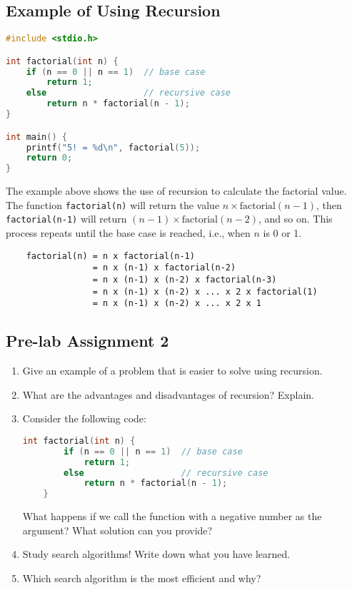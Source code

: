 \subsection{Example of Using Recursion}

\begin{lstlisting}[language=c]
#include <stdio.h>

int factorial(int n) {
	if (n == 0 || n == 1)  // base case
		return 1;
	else                   // recursive case
		return n * factorial(n - 1);
}

int main() {
	printf("5! = %d\n", factorial(5));
	return 0;
}
\end{lstlisting}

The example above shows the use of recursion to calculate the factorial value.  
The function \texttt{factorial(n)} will return the value $n \times \text{factorial}(n-1)$, then \texttt{factorial(n-1)} will return $(n-1) \times \text{factorial}(n-2)$, and so on.  
This process repeats until the base case is reached, i.e., when $n$ is 0 or 1.

\begin{verbatim}
    factorial(n) = n x factorial(n-1)
                 = n x (n-1) x factorial(n-2)
                 = n x (n-1) x (n-2) x factorial(n-3)
                 = n x (n-1) x (n-2) x ... x 2 x factorial(1)
                 = n x (n-1) x (n-2) x ... x 2 x 1
\end{verbatim}

\subsection*{Pre-lab Assignment 2}
\begin{enumerate}
    \item Give an example of a problem that is easier to solve using recursion.
    \item What are the advantages and disadvantages of recursion? Explain.
    \item Consider the following code:
    \begin{lstlisting}[language=c]
	int factorial(int n) {
		if (n == 0 || n == 1)  // base case
			return 1;
		else                   // recursive case
			return n * factorial(n - 1);
	}
\end{lstlisting}
    What happens if we call the function with a negative number as the argument?  
    What solution can you provide?
    \item Study search algorithms! Write down what you have learned.
    \item Which search algorithm is the most efficient and why?
\end{enumerate}
